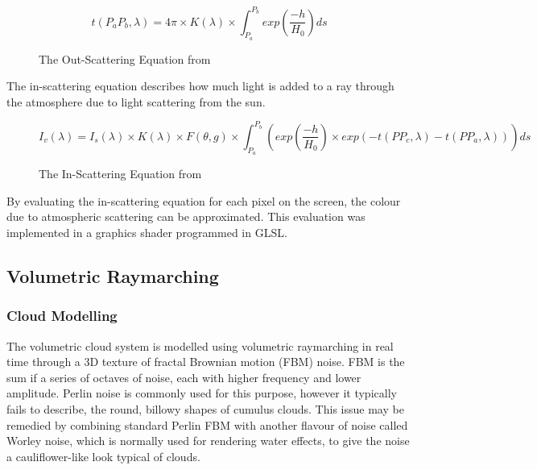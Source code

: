 \documentclass[10pt, openany]{book}
\begin{document}
\begin{figure}[H]
	\centering
	\[t(P_aP_b,\lambda) = 4\pi \times K(\lambda) \times \int_{P_a}^{P_b} exp(\frac{-h}{H_0}) ds \]
	\caption{The Out-Scattering Equation from \citep{gpugems2}}
\end{figure}

The in-scattering equation describes how much light is added to a ray through the atmosphere due to light scattering from the sun.

\begin{figure}[H]
	\centering
	\[I_v(\lambda) = I_s(\lambda) \times K(\lambda) \times F(\theta, g) \times \int_{P_a}^{P_b}(exp(\frac{-h}{H_0}) \times exp(-t(PP_c,\lambda) - t(PP_a,\lambda))) ds \]
	\caption{The In-Scattering Equation from \citep{gpugems2}}
\end{figure}

By evaluating the in-scattering equation for each pixel on the screen, the colour due to atmospheric scattering can be approximated. This evaluation was implemented in a graphics shader programmed in \Gls{GLSL}.

\subsection{Volumetric Raymarching}

\subsubsection{Cloud Modelling}

The volumetric cloud system is modelled using volumetric raymarching in real time through a 3D texture of fractal Brownian motion (FBM) noise. FBM is the sum if a series of octaves of noise, each with higher frequency and lower amplitude. Perlin noise is commonly used for this purpose, however it typically fails to describe, the round, billowy shapes of cumulus clouds. This issue may be remedied by combining standard Perlin FBM with another flavour of noise called Worley noise, which is normally used for rendering water effects, to give the noise a cauliflower-like look typical of clouds. \citep{gpupro7} 
\end{document}
